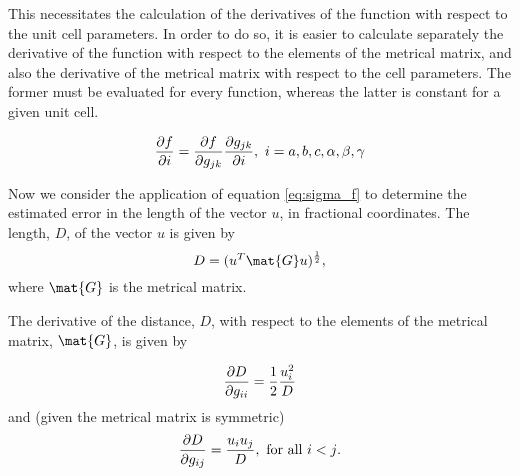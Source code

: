 \documentclass[pdf]{iucr}
\begin{document}
This necessitates the calculation of the derivatives of the function with respect to the unit cell parameters. In order to do so, it is easier to calculate separately the derivative of the function with respect to the elements of the metrical matrix, and also the derivative of the metrical matrix with respect to the cell parameters. The former must be evaluated for every function, whereas the latter is constant for a given unit cell.

\begin{equation}
\frac{\partial f}{\partial i} = \frac{\partial f}{\partial g_{jk}}\frac{\partial g_{jk}}{\partial i},\ i=a, b, c, \alpha, \beta, \gamma
\label{eq:df_dcell}
\end{equation}

Now we consider the application of equation \ref{eq:sigma_f} to determine the estimated error in the length of the vector $u$, in fractional coordinates. The length, $D$, of the  vector $u$ is given by
\begin{equation}
D = (u^T \mat{G} u)^\frac{1}{2}
\label{eq:bond_length},
\end{equation}
where $\mat{G}$ is the metrical matrix.

The derivative of the distance, $D$, with respect to the elements of the metrical matrix, $\mat{G}$, is given by
%

\begin{equation}
\frac{\partial D}{\partial g_{ii}} = \frac{1}{2} \frac{u_i^2}{D}
\label{eq:d_distance_d_gii}
\end{equation}
and (given the metrical matrix is symmetric)
\begin{equation}
\frac{\partial D}{\partial g_{ij}} = \frac{u_i u_j}{D},\ \text{for all $i<j$}.
\label{eq:d_distance_d_gij}
\end{equation}
\end{document}

